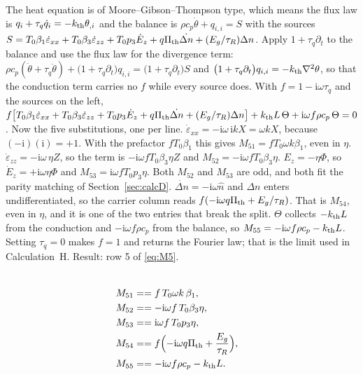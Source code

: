 \documentclass[11pt]{article}
\makeatletter
\newif\ifshowworked
\newenvironment{worked}{%
  \ifshowworked\par\smallskip\noindent\textit{Working.}\par\smallskip\else
  \setbox\z@\vbox\bgroup\fi}{\ifshowworked\par\smallskip\else\egroup\fi}
\newcommand{\ii}{\mathrm{i}}
\makeatother
\begin{document}
\begin{worked}
The heat equation is of Moore--Gibson--Thompson type, which means the flux law is
$q_i+\tau_q\dot q_i=-k_{\rm th}\theta_{,i}$ and the balance is $\rho c_p\dot\theta+q_{i,i}=S$
with the sources $S=T_0\beta_1\dot\varepsilon_{xx}+T_0\beta_3\dot\varepsilon_{zz}
+T_0p_3\dot E_z+q\Pi_{\rm th}\dot{\Delta n}+(E_g/\tau_R)\Delta n$.
Apply $1+\tau_q\partial_t$ to the balance and use the flux law for the divergence term:
$\rho c_p(\dot\theta+\tau_q\ddot\theta)+\bigl(1+\tau_q\partial_t\bigr)q_{i,i}
=\bigl(1+\tau_q\partial_t\bigr)S$ and $\bigl(1+\tau_q\partial_t\bigr)q_{i,i}=-k_{\rm th}\nabla^2\theta$,
so that the conduction term carries no $f$ while every source does. With
$f=1-\ii\omega\tau_q$ and the sources on the left,
$f\bigl[T_0\beta_1\dot\varepsilon_{xx}+T_0\beta_3\dot\varepsilon_{zz}+T_0p_3\dot E_z
+q\Pi_{\rm th}\dot{\Delta n}+(E_g/\tau_R)\Delta n\bigr]
+k_{\rm th}L\,\Theta+\ii\omega f\rho c_p\,\Theta=0$.
Now the five substitutions, one per line.
$\dot\varepsilon_{xx}=-\ii\omega\,\ii kX=\omega kX$, because $(-\ii)(\ii)=+1$. With the prefactor
$fT_0\beta_1$ this gives $M_{51}=fT_0\omega k\beta_1$, even in $\eta$.
$\dot\varepsilon_{zz}=-\ii\omega\,\eta Z$, so the term is $-\ii\omega fT_0\beta_3\eta Z$ and
$M_{52}=-\ii\omega fT_0\beta_3\eta$.
$E_z=-\eta\Phi$, so $\dot E_z=+\ii\omega\eta\Phi$ and $M_{53}=\ii\omega fT_0p_3\eta$. Both
$M_{52}$ and $M_{53}$ are odd, and both fit the parity matching of Section~\ref{sec:calcD}.
$\dot{\Delta n}=-\ii\omega\hat n$ and $\Delta n$ enters undifferentiated, so the carrier column
reads $f(-\ii\omega q\Pi_{\rm th}+E_g/\tau_R)$. That is $M_{54}$, even in $\eta$, and it is one
of the two entries that break the split.
$\Theta$ collects $-k_{\rm th}L$ from the conduction and $-\ii\omega f\rho c_p$ from the balance, so
$M_{55}=-\ii\omega f\rho c_p-k_{\rm th}L$. Setting $\tau_q=0$ makes $f=1$ and returns the Fourier
law; that is the limit used in Calculation~H.
Result: row 5 of \eqref{eq:M5}.
\end{worked}

\begin{align}
\label{eq:M5} \\
M_{51}&==f\,T_0\omega k\,\beta_1, \\
M_{52}&==-\ii\omega f\,T_0\beta_3\eta, \\
M_{53}&==\ii\omega f\,T_0p_3\eta, \\
M_{54}&==f\Bigl(-\ii\omega q\Pi_{\rm th}+\frac{E_g}{\tau_R}\Bigr), \\
M_{55}&==-\ii\omega f\rho c_p-k_{\rm th}L .
\end{align}
\end{document}
